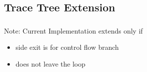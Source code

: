 \documentclass[mathserif,10pt]{beamer}
\begin{document}
\frame
{
  \frametitle{\subsecname}
  \begin{figure}[h]
  \centering
  \end{figure}
}
\subsection{Trace Tree Extension}
\frame
{
  \frametitle{\subsecname}
  \begin{figure}[h]
  \centering
  \end{figure}
Note: Current Implementation extends only if 
        \begin{itemize}
          \item side exit is for control flow branch
          \item does not leave the loop
        \end{itemize}
}
\end{document}
